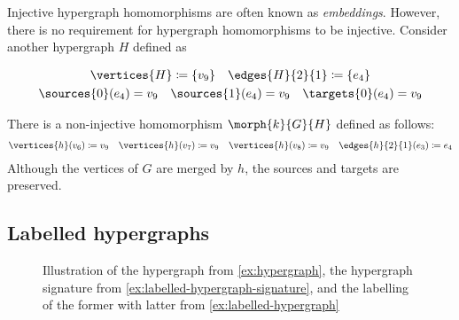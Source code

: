 \begin{example}
\begin{center}
\begin{minipage}{0.2\textwidth}
            \vspace{1.5em}

        \end{minipage}
    \end{center}

    Injective hypergraph homomorphisms are often known as \emph{embeddings}.
    However, there is no requirement for hypergraph homomorphisms to be
    injective.
    Consider another hypergraph \(H\) defined as
    \begin{center}
        \begin{minipage}{0.75\textwidth}
            \begin{gather*}
                \vertices{H} \coloneqq \{v_9\}
                \quad
                \edges{H}{2}{1} \coloneqq \{e_4\}
                \\
                \sources{0}(e_4) = v_9
                \quad
                \sources{1}(e_4) = v_9
                \quad
                \targets{0}(e_4) = v_9
            \end{gather*}
        \end{minipage}
        \begin{minipage}{0.2\textwidth}
            \centering

            \vspace{1.5em}

        \end{minipage}
    \end{center}
    There is a non-injective homomorphism \(\morph{k}{G}{H}\) defined as
    follows:
    \begin{gather*}
        \vertices{h}(v_6) \coloneqq v_9
        \quad
        \vertices{h}(v_7) \coloneqq v_9
        \quad
        \vertices{h}(v_8) \coloneqq v_9
        \quad
        \edges{h}{2}{1}(e_3) \coloneqq e_4
    \end{gather*}
    Although the vertices of \(G\) are merged by \(h\), the sources and
    targets are preserved.
\end{example}

\subsection{Labelled hypergraphs}

\begin{figure}
    \centering
    \qquad
    \qquad
    \caption{Illustration of the hypergraph from \cref{ex:hypergraph}, the
        hypergraph signature from \cref{ex:labelled-hypergraph-signature}, and the
        labelling of the former with latter from \cref{ex:labelled-hypergraph}
    }
    \label{fig:hypergraph-ex}
\end{figure}

